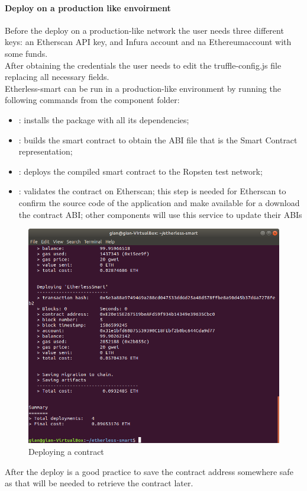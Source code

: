 \paragraph{Deploy on a production like envoirment}
Before the deploy on a production-like network the user needs three different keys: an Etherscan API
key, and Infura account and na Ethereum\glo account with some funds.\\
After obtaining the credentials the user needs to edit the truffle-config.js file replacing all necessary fields. \\
Etherless-smart can be run in a production-like environment
by running the following commands from the component folder:
\begin{itemize}
    \item {} : installs the package with all its dependencies;
    \item {}: builds the smart contract to obtain the ABI file that is the Smart Contract representation;
    \item {}: deploys the compiled smart contract to the Ropsten test network;
    \item {}: validates the contract on Etherscan; this step is needed for Etherscan to confirm the source code of the application and make available for a download the contract ABI; other components will use this service to update their ABIs\glo
\end{itemize}
\begin{figure}[h]
	\centering
	\includegraphics[width=\textwidth]{res/img/deployContract.png}
	\caption{Deploying a contract}
\end{figure}
After the deploy is a good practice to save the contract address somewhere safe as that will be needed to retrieve the contract later.
